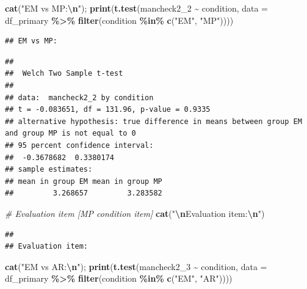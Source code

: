 \documentclass[
]{article}
\newenvironment{Shaded}{\begin{snugshade}}{\end{snugshade}}
\newcommand{\AttributeTok}[1]{\textcolor[rgb]{0.13,0.29,0.53}{#1}}
\newcommand{\CommentTok}[1]{\textcolor[rgb]{0.56,0.35,0.01}{\textit{#1}}}
\newcommand{\FunctionTok}[1]{\textcolor[rgb]{0.13,0.29,0.53}{\textbf{#1}}}
\newcommand{\NormalTok}[1]{#1}
\newcommand{\SpecialCharTok}[1]{\textcolor[rgb]{0.81,0.36,0.00}{\textbf{#1}}}
\newcommand{\StringTok}[1]{\textcolor[rgb]{0.31,0.60,0.02}{#1}}
\begin{document}
\begin{Shaded}
\begin{Highlighting}[]
\FunctionTok{cat}\NormalTok{(}\StringTok{"EM vs MP:}\SpecialCharTok{\textbackslash{}n}\StringTok{"}\NormalTok{); }\FunctionTok{print}\NormalTok{(}\FunctionTok{t.test}\NormalTok{(mancheck2\_2 }\SpecialCharTok{\textasciitilde{}}\NormalTok{ condition, }
       \AttributeTok{data =}\NormalTok{ df\_primary }\SpecialCharTok{\%\textgreater{}\%} \FunctionTok{filter}\NormalTok{(condition }\SpecialCharTok{\%in\%} \FunctionTok{c}\NormalTok{(}\StringTok{"EM"}\NormalTok{, }\StringTok{"MP"}\NormalTok{))))}
\end{Highlighting}
\end{Shaded}

\begin{verbatim}
## EM vs MP:
\end{verbatim}

\begin{verbatim}
## 
##  Welch Two Sample t-test
## 
## data:  mancheck2_2 by condition
## t = -0.083651, df = 131.96, p-value = 0.9335
## alternative hypothesis: true difference in means between group EM and group MP is not equal to 0
## 95 percent confidence interval:
##  -0.3678682  0.3380174
## sample estimates:
## mean in group EM mean in group MP 
##         3.268657         3.283582
\end{verbatim}

\begin{Shaded}
\begin{Highlighting}[]
\CommentTok{\# Evaluation item [MP condition item]}
\FunctionTok{cat}\NormalTok{(}\StringTok{"}\SpecialCharTok{\textbackslash{}n}\StringTok{Evaluation item:}\SpecialCharTok{\textbackslash{}n}\StringTok{"}\NormalTok{)}
\end{Highlighting}
\end{Shaded}

\begin{verbatim}
## 
## Evaluation item:
\end{verbatim}

\begin{Shaded}
\begin{Highlighting}[]
\FunctionTok{cat}\NormalTok{(}\StringTok{"EM vs AR:}\SpecialCharTok{\textbackslash{}n}\StringTok{"}\NormalTok{); }\FunctionTok{print}\NormalTok{(}\FunctionTok{t.test}\NormalTok{(mancheck2\_3 }\SpecialCharTok{\textasciitilde{}}\NormalTok{ condition, }
       \AttributeTok{data =}\NormalTok{ df\_primary }\SpecialCharTok{\%\textgreater{}\%} \FunctionTok{filter}\NormalTok{(condition }\SpecialCharTok{\%in\%} \FunctionTok{c}\NormalTok{(}\StringTok{"EM"}\NormalTok{, }\StringTok{"AR"}\NormalTok{))))}
\end{Highlighting}
\end{Shaded}
\end{document}
